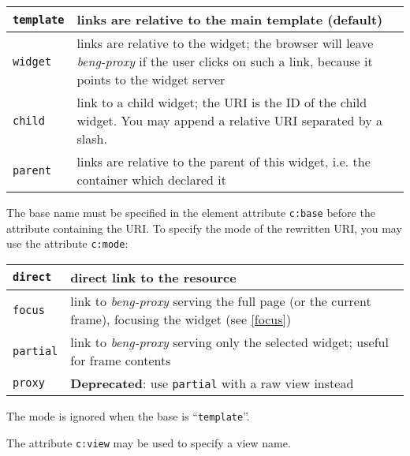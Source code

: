 \documentclass[a4paper,12pt]{article}
\begin{document}
\begin{tabular}{|l|p{10cm}|}
\hline

\texttt{template} & links are relative to the main template (default)
\\

\hline

\texttt{widget} & links are relative to the widget; the browser will
leave \emph{beng-proxy} if the user clicks on such a link, because it
points to the widget server \\

\hline

\texttt{child} & link to a child widget; the URI is the ID of the
child widget.  You may append a relative URI separated by a slash. \\

\hline

\texttt{parent} & links are relative to the parent of this widget,
i.e. the container which declared it \\

\hline
\end{tabular}

The base name must be specified in the element attribute
\texttt{c:base} before the attribute containing the URI.  To specify
the mode of the rewritten URI, you may use the attribute
\texttt{c:mode}:

\label{c_mode}
\begin{tabular}{|l|p{10cm}|}
\hline

\texttt{direct} & direct link to the resource \\

\hline

\texttt{focus} & link to \emph{beng-proxy} serving the full page (or
the current frame), focusing the widget (see \ref{focus}) \\

\hline

\texttt{partial} & link to \emph{beng-proxy} serving only the selected
widget; useful for frame contents \\

\hline

\texttt{proxy} & \textbf{Deprecated}: use \texttt{partial} with a raw
view instead \\

\hline
\end{tabular}

The mode is ignored when the base is ``\texttt{template}''.

The attribute \texttt{c:view} may be used to specify a view name.
\end{document}
